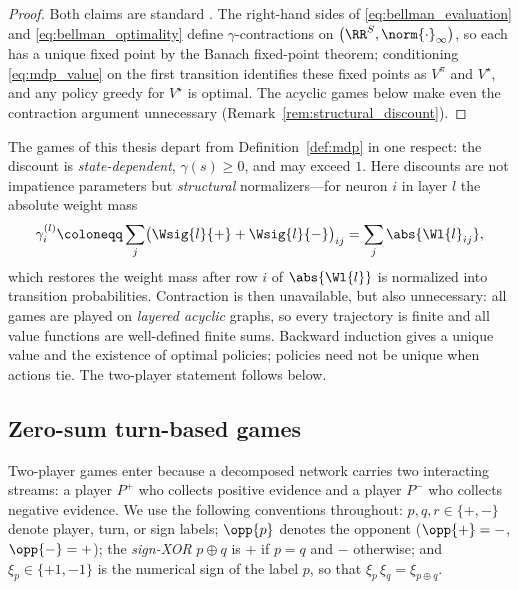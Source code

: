 \begin{proof}
Both claims are standard \parencite{Puterman1994mdp,SuttonBarto2018rl}. The right-hand sides of \eqref{eq:bellman_evaluation} and \eqref{eq:bellman_optimality} define $\gamma$-contractions on $\bigl(\RR^{S}, \norm{\cdot}_{\infty}\bigr)$, so each has a unique fixed point by the Banach fixed-point theorem; conditioning \eqref{eq:mdp_value} on the first transition identifies these fixed points as $V^{\pi}$ and $V^{\star}$, and any policy greedy for $V^{\star}$ is optimal. The acyclic games below make even the contraction argument unnecessary (Remark~\ref{rem:structural_discount}).
\end{proof}

\begin{remark}\label{rem:structural_discount}
The games of this thesis depart from Definition~\ref{def:mdp} in one respect: the discount is \emph{state-dependent}, $\gamma(s) \ge 0$, and may exceed $1$. Here discounts are not impatience parameters but \emph{structural} normalizers---for neuron $i$ in layer $l$ the absolute weight mass
\begin{equation}
	\gamma^{(l)}_i \coloneqq \sum_{j} \bigl( \Wsig{l}{+} + \Wsig{l}{-} \bigr)_{ij} = \sum_j \abs{\Wl{l}_{ij}},
	\label{eq:structural_discount}
\end{equation}
which restores the weight mass after row $i$ of $\abs{\Wl{l}}$ is normalized into transition probabilities. Contraction is then unavailable, but also unnecessary: all games are played on \emph{layered acyclic} graphs, so every trajectory is finite and all value functions are well-defined finite sums. Backward induction gives a unique value and the existence of optimal policies; policies need not be unique when actions tie. The two-player statement follows below.
\end{remark}

\subsection*{Zero-sum turn-based games}

Two-player games enter because a decomposed network carries two interacting streams: a player $P^{+}$ who collects positive evidence and a player $P^{-}$ who collects negative evidence. We use the following conventions throughout: $p, q, r \in \{+, -\}$ denote player, turn, or sign labels; $\opp{p}$ denotes the opponent ($\opp{+} = -$, $\opp{-} = +$); the \emph{sign-XOR} $p \oplus q$ is $+$ if $p = q$ and $-$ otherwise; and $\xi_{p} \in \{+1, -1\}$ is the numerical sign of the label $p$, so that $\xi_{p}\, \xi_{q} = \xi_{p \oplus q}$.

